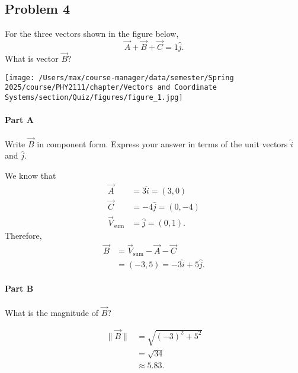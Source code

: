 
\newpage

\subsection{Problem 4}

For the three vectors shown in the figure below,
\[
	\vec{A} + \vec{B} + \vec{C} = 1\hat{j}
	.\]
What is vector $\vec{B}$?

\begin{center}
	\texttt{[image: /Users/max/course-manager/data/semester/Spring 2025/course/PHY2111/chapter/Vectors and Coordinate Systems/section/Quiz/figures/figure\_1.jpg]}
\end{center}

\setcounter{partcounter}{1}
\paragraph{Part A}

Write $\vec{B}$ in component form. Express your answer in terms of the unit vectors $\hat{i}$ and $\hat{j}$.

\begin{solution}
	We know that
	\begin{align*}
		\vec{A} &= 3\hat{i} = \left( 3, 0 \right) \\
		\vec{C} &= -4\hat{j} = \left( 0, -4 \right) \\
		\vec{V}_{\mathrm{sum}} &= \hat{j} = \left( 0, 1 \right)
		.\end{align*}
	Therefore,
	\begin{align*}
		\vec{B} &= \vec{V}_{\mathrm{sum}} - \vec{A} - \vec{C} \\
		&= \left( -3, 5 \right) = -3\hat{i} + 5\hat{j}
		.\end{align*}
\end{solution}

\setcounter{partcounter}{2}
\paragraph{Part B}

What is the magnitude of $\vec{B}$?

\begin{solution}
	\begin{align*}
		\lVert \vec{B} \rVert &= \sqrt{\left( -3 \right)^2 + 5^2} \\
		&= \sqrt{34} \\
		&\approx 5.83
		.\end{align*}
\end{solution}

